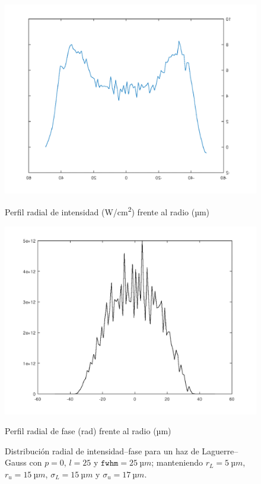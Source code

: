 \begin{figure}[htbp]
  \centering
  \begin{subcaptionblock}{.4\textwidth}
    \centering
    \includegraphics[width=\textwidth]{Figuras/anx_oamfs_2.png}
    \caption*{Perfil radial de intensidad (\unit{W/cm^2}) frente al radio (\unit{µm})}
  \end{subcaptionblock}
  \begin{subcaptionblock}{.4\textwidth}
    \centering
    \includegraphics[width=\textwidth]{Figuras/anx_oamint_2.png}
    \caption*{Perfil radial de fase (\unit{rad}) frente al radio (\unit{µm})}
  \end{subcaptionblock}
   \caption*{Distribución radial de intensidad--fase para un haz de Laguerre--Gauss con $p=0$, $l=25$ y $\texttt{fwhm}=\qty{25}{µm}$; manteniendo $r_{L}=\qty{5}{µm}$, $r_{u}=\qty{15}{µm}$, $\sigma_{L}=\qty{15}{µm}$ y $\sigma_{u}=\qty{17}{µm}$.}
\end{figure}

